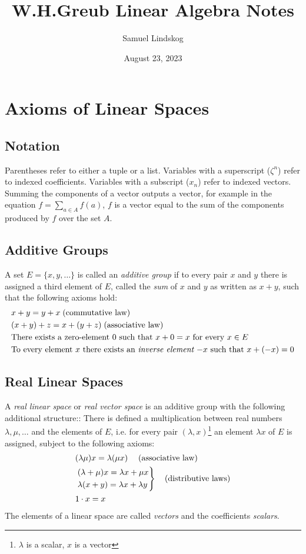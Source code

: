 \documentclass{article}
\begin{document}
\title{W.H.Greub Linear Algebra Notes}
\author{Samuel Lindskog}
\date{August 23, 2023}
\maketitle
\renewcommand{\abstractname}{}

\setcounter{secnumdepth}{2}

\section{Axioms of Linear Spaces}
\subsection*{Notation}
Parentheses refer to either a tuple or a list. Variables with a superscript (\(\zeta^{n}\)) refer to indexed coefficients. Variables with a subscript (\(x_{n}\)) refer to indexed vectors. Summing the components of a vector outputs a vector, for example in the equation \(f=\sum_{a\in A}f(a)\), \(f\) is a vector equal to the sum of the components produced by \(f\) over the set \(A\).
\subsection{Additive Groups}
A set \(E=\{x,y,\ldots\}\) is called an \emph{additive group} if to every pair \(x\) and \(y\) there is assigned a third element of \(E\), called the \emph{sum} of \(x\) and \(y\) as written as \(x+y\), such that the following axioms hold:
\begin{align*}
	&x+y=y+x\text{\;(commutative law)}\\
	&(x+y)+z=x+(y+z)\text{\;(associative law)}\\
	&\text{There exists a zero-element \(0\) such that \(x+0=x\) for every 
	\(x\in E\)}\\
	&\text{To every element \(x\) there exists an \emph{inverse element}\;\(-x\) such that \(x+(-x)=0\)}
\end{align*}
\subsection{Real Linear Spaces}
A \emph{real linear space} or \emph{real vector space} is an additive group with the following additional structure:: There is defined a multiplication between real numbers \(\lambda,\mu,\ldots\) and the elements of \(E\), i.e. for every pair \((\lambda,x)\)\footnote{\(\lambda\) is a scalar, \(x\) is a vector} an element \(\lambda x\) of \(E\) is assigned, subject to the following axioms:
\begin{align*}
	&(\lambda\mu)x=\lambda(\mu x)\quad\text{\;(associative law)}\\
	&\left.\begin{aligned}&(\lambda+\mu)x=\lambda x+\mu x\\
	&\lambda(x+y)=\lambda x+\lambda y\end{aligned}\right\}\quad\text{(distributive laws)}\\
	&1\cdot x=x
\end{align*}
The elements of a linear space are called \emph{vectors} and the coefficients \emph{scalars}.
\end{document}
